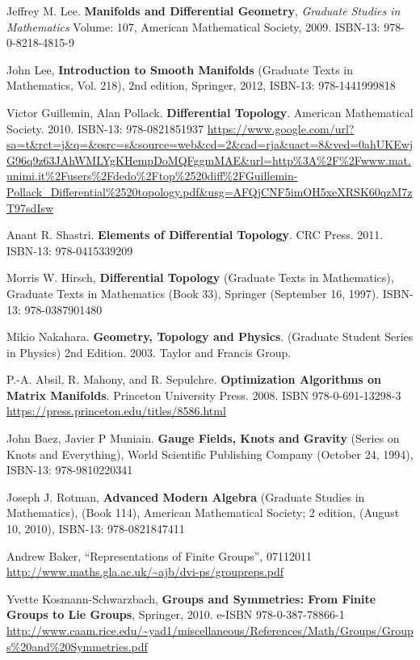 Jeffrey M. Lee. \textbf{Manifolds and Differential Geometry}, \emph{Graduate Studies in Mathematics} Volume: 107, American Mathematical Society, 2009. ISBN-13: 978-0-8218-4815-9

John Lee, \textbf{Introduction to Smooth Manifolds} (Graduate Texts in Mathematics, Vol. 218), 2nd edition, Springer,  2012, ISBN-13: 978-1441999818

Victor Guillemin, Alan Pollack. \textbf{Differential Topology}. American Mathematical Society. 2010. ISBN-13: 978-0821851937
\url{https://www.google.com/url?sa=t&rct=j&q=&esrc=s&source=web&cd=2&cad=rja&uact=8&ved=0ahUKEwjG96q9z63JAhWMLYgKHempDoMQFggmMAE&url=http\%3A\%2F\%2Fwww.mat.unimi.it\%2Fusers\%2Fdedo\%2Ftop\%2520diff\%2FGuillemin-Pollack_Differential\%2520topology.pdf&usg=AFQjCNF5imOH5xeXRSK60qzM7zT97sdIsw}

Anant R. Shastri. \textbf{Elements of Differential Topology}. CRC Press. 2011. ISBN-13: 978-0415339209

Morris W. Hirsch, \textbf{Differential Topology} (Graduate Texts in Mathematics), Graduate Texts in Mathematics (Book 33), Springer (September 16, 1997). ISBN-13: 978-0387901480

Mikio Nakahara. \textbf{Geometry, Topology and Physics}. (Graduate Student Series in Physics) 2nd Edition. 2003. Taylor and Francis Group.

P.-A. Absil, R. Mahony, and R. Sepulchre.  \textbf{Optimization Algorithms on Matrix Manifolds}.  Princeton University Press.  2008.  ISBN 978-0-691-13298-3
\url{https://press.princeton.edu/titles/8586.html}  

John Baez, Javier P Muniain.  \textbf{Gauge Fields, Knots and Gravity} (Series on Knots and Everything), World Scientific Publishing Company (October 24, 1994), ISBN-13: 978-9810220341

Joseph J. Rotman, \textbf{Advanced Modern Algebra} (Graduate Studies in Mathematics), (Book 114), American Mathematical Society; 2 edition, (August 10, 2010), ISBN-13: 978-0821847411

Andrew Baker, ``Representations of Finite Groups'', 07112011
\url{http://www.maths.gla.ac.uk/~ajb/dvi-ps/groupreps.pdf}

Yvette Kosmann-Schwarzbach, \textbf{Groups and Symmetries: From Finite Groups to Lie Groups}, Springer, 2010. e-ISBN 978-0-387-78866-1 \url{http://www.caam.rice.edu/~yad1/miscellaneous/References/Math/Groups/Groups\%20and\%20Symmetries.pdf}

